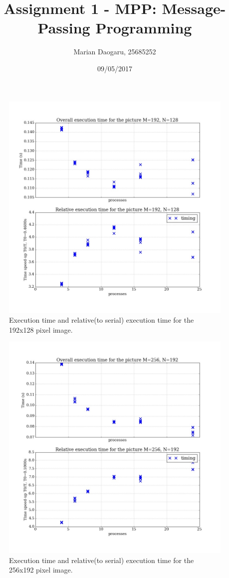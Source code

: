 \documentclass[11pt]{article}
\title{Assignment 1 - MPP: Message-Passing Programming}
\author{Marian Daogaru, 25685252}
\date{09/05/2017}
\begin{document}
	
	\maketitle
	\pagebreak
	\tableofcontents
	\pagebreak
	
	
	\begin{figure}[H]	
		\centering
		\includegraphics[scale=0.4]{exec_192x128.jpeg}
		\caption{Execution time and relative(to serial) execution time for the 192x128 pixel image.}\label{exec_1}
	\end{figure}

	\begin{figure}[H]	
		\centering
		\includegraphics[scale=0.4]{exec_256x192.jpeg}
		\caption{Execution time and relative(to serial) execution time for the 256x192 pixel image.}\label{exec_2}
	\end{figure}
\end{document}
